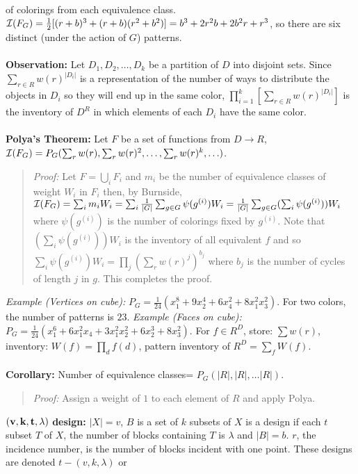 of colorings from each equivalence class.
${\cal I}(F_G)= {\frac 1 2}[(r+b)^3+(r+b)(r^2 + b^2)]= b^3 + 2r^2b + 2 b^2r + r^3$, so there are
six distinct (under the action of $G$) patterns.
\\
\\
{\bf Observation:}
Let $D_1, D_2, \ldots, D_k$ be a partition of $D$ into disjoint sets.
Since $\sum_{r \in R} w(r)^{|D_i|}$ is a
representation of the number of ways to distribute the objects
in $D_i$ so they will end up in the same color,
$\prod_{i=1}^k [\sum_{r \in R} w(r)^{|D_i|}]$ is the inventory of
$D^R$ in which elements of each $D_i$ have the same color.
\\
\\
{\bf Polya's Theorem:} Let $F$ be a set of functions from $D \rightarrow R$,
${\cal I}(F_G)= P_G(\sum_r w(r), \sum_r w(r)^2, \ldots , \sum_r w(r)^k, \ldots)$.
\begin{quote}
\emph{Proof:}
Let $F= \bigcup_i F_i$ and $m_i$ be the number of equivalence classes of 
weight $W_i$ in $F_i$ then, by Burnside, 
${\cal I}(F_G)= \sum_i m_i W_i= \sum_i {\frac 1 {|G|}} \sum_{g \in G} \psi(g^{(i)}) W_i=
{\frac 1 {|G|}} \sum_{g \in G} (\sum_i \psi(g^{(i)})) W_i$ where
$\psi(g^{(i)})$
is the number of colorings fixed by $g^{(i)}$.
Note that $(\sum_i \psi(g^{(i)}))W_i$ is the inventory 
of all equivalent $f$ and so
$\sum_i \psi(g^{(i)}) W_i = \prod_j (\sum_r w(r)^j)^{b_j}$ 
where $b_j$ is the number of cycles of
length $j$ in $g$.  This completes the proof.
\end{quote}
\emph{Example (Vertices on cube):}
$P_G= {\frac {1} {24}}
(x_{1}^{8}+ 9x_{2}^4+ 6x_{4}^{2} + 8x_{1}^{2} x_{3}^2)$.  For two colors,
the number of patterns is $23$.
\emph{Example (Faces on cube):}
$P_G= {\frac {1} {24}}
(x_{1}^{6}+ 6x_{1}^{2}x_{4}+ 3x_{1}^{2}x_{2}^2 + 6x_{2}^{3} + 8x_{3}^{2})$.
For $f \in R^{D}$, store: $\sum w(r)$, inventory: $W(f)= \prod_{d} f(d)$,
pattern inventory of $R^{D}= \sum_{f} W(f)$.
\\
\\
{\bf Corollary:}
Number of equivalence classes= $P_{G}(|R|,|R|, \ldots |R|)$.
\begin{quote}
\emph{Proof:}
Assign a weight of $1$ to each element of $R$ and apply Polya.
\end{quote}
${\bf (v, k, t, \lambda )}$ {\bf design:}
$|X|= v$, $B$ is a set of $k$ subsets of
$X$ is a design if each $t$ subset $T$ of $X$,
the number of blocks containing $T$ is
$\lambda$ and $|B|=b$.
$r$, the incidence number, is the number of blocks incident
with one point.  These designs are denoted $t-(v,k, \lambda )$ or
